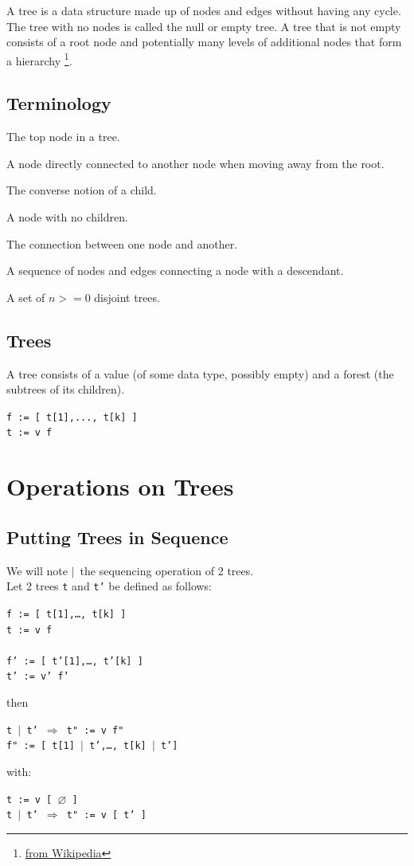 \documentclass{article}
\newcommand{\code}	[2][0.9]		{\vspace{0mm}\begin{center}\colorbox{mygrey}{
							\begin{minipage}[t]{#1\columnwidth} 
							{\small \texttt{#2}}
							\end{minipage}}\end{center}}
\newcommand{\op}	[1]		{\vspace{0mm}\begin{center}\colorbox{mygrey}{
							\begin{minipage}[t]{0.9\columnwidth} 
							{\small \texttt{#1}}
							\end{minipage}}\end{center}}
\newcommand{\nulltree}	{\ensuremath{\varnothing}}
\newcommand{\seq}		{\ensuremath{|}}
\newcommand{\etc}		{…}
\begin{document}
A tree is a data structure made up of nodes and edges without having any cycle. The tree with no nodes is called the null or empty tree. A tree that is not empty consists of a root node and potentially many levels of additional nodes that form a hierarchy \footnote{\href{https://en.wikipedia.org/wiki/Tree_(data_structure)}{from Wikipedia}}.


\subsection{Terminology}

\begin{description}
 \setlength\itemsep{0.0em}
\item[Root]	The top node in a tree.
\item[Child]	A node directly connected to another node when moving away from the root.
\item[Parent]	The converse notion of a child.
\item[Leaf]	A node with no children.
\item[Edge]	The connection between one node and another.
\item[Path]	A sequence of nodes and edges connecting a node with a descendant.
\item[Forest]	A set of $n >= 0$ disjoint trees.
\end{description}

\subsection{Trees}
A tree consists of a value (of some data type, possibly empty) and a forest (the subtrees of its children).
\code{f := [ t[1],..., t[k] ] \\
t :=  v f
}


\section{Operations on Trees}

\subsection{Putting Trees in Sequence}
We will note \seq\ the sequencing operation of 2 trees. \\
Let 2 trees \texttt{t} and \texttt{t'} be defined as follows:
\op{f := [ t[1],\etc, t[k] ] \\
t :=  v f \\
\\
f' := [ t'[1],\etc, t'[k] ] \\
t' :=  v' f'
}
then
\op{t \seq\ t'  $\Rightarrow$  t" := v f" \\
f" := [ t[1] \seq\ t',\etc, t[k] \seq\ t']
}
with: 
\op{t :=  v [ \nulltree\ ]\\
t \seq\ t'  $\Rightarrow$  t" := v [ t' ]
}
\end{document}

